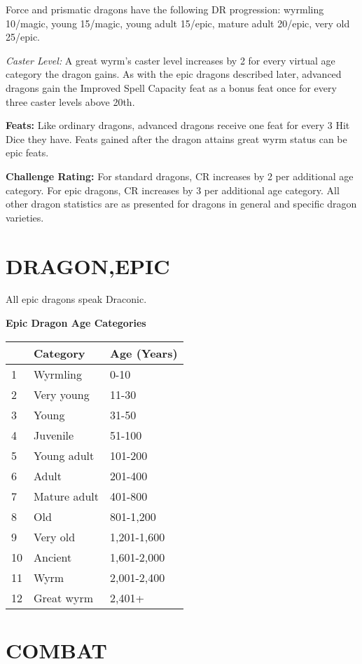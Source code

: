 \documentclass{article}
\begin{document}
Force and prismatic dragons have the following DR progression: wyrmling 10/magic, 
young 15/magic, young adult 15/epic, mature adult 20/epic, very old 25/epic.

\textit{Caster Level: }A great wyrm's caster level increases by 2 for every virtual 
age category the dragon gains. As with the epic dragons described later, advanced 
dragons gain the Improved Spell Capacity feat as a bonus feat once for every three 
caster levels above 20th. 

\vspace{12pt}
\textbf{Feats:} Like ordinary dragons, advanced dragons receive one feat for every 
3 Hit Dice they have. Feats gained after the dragon attains great wyrm status can 
be epic feats. 

\vspace{12pt}
\textbf{Challenge Rating:} For standard dragons, CR increases by 2 per additional 
age category. For epic dragons, CR increases by 3 per additional age category. 
All other dragon statistics are as presented for dragons in general and specific 
dragon varieties. 

\vspace{12pt}
\section*{{\LARGE{}DRAGON,EPIC }}

All epic dragons speak Draconic. 

\textbf{Epic Dragon Age Categories }

\begin{tabular}{|>{\raggedright}p{8pt}|>{\raggedright}p{50pt}|>{\raggedright}p{49pt}|}
\hline
  & C\textbf{ategory } & A\textbf{ge (Years)}\tabularnewline
\hline
1  & Wyrmling  & 0-10\tabularnewline
\hline
2  & Very young  & 11-30\tabularnewline
\hline
3  & Young  & 31-50\tabularnewline
\hline
4  & Juvenile  & 51-100\tabularnewline
\hline
5  & Young adult  & 101-200\tabularnewline
\hline
6  & Adult  & 201-400\tabularnewline
\hline
7  & Mature adult  & 401-800\tabularnewline
\hline
8  & Old  & 801-1,200\tabularnewline
\hline
9  & Very old  & 1,201-1,600\tabularnewline
\hline
10  & Ancient  & 1,601-2,000\tabularnewline
\hline
11  & Wyrm  & 2,001-2,400\tabularnewline
\hline
12  & Great wyrm  & 2,401+\tabularnewline
\hline
\end{tabular} 

\vspace{12pt}
\section*{COMBAT\textbf{ }}
\end{document}
